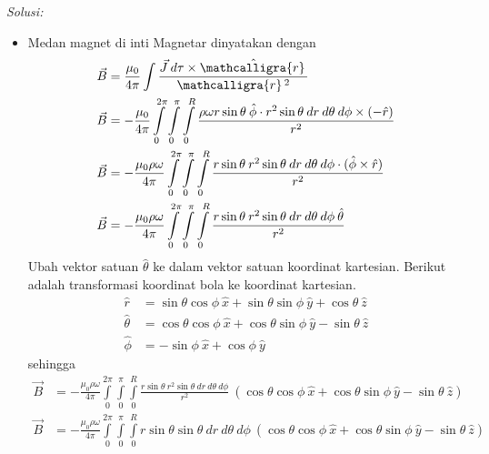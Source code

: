 \documentclass[a4paper, 11pt]{article}
\newcommand{\scriptr}{\mathcalligra{r}\,}
\newenvironment{solution}
    {\textit{Solusi:}}
    {}
\begin{document}
\begin{solution}
\begin{itemize}
    \item[b.] Medan magnet di inti Magnetar dinyatakan dengan
    \begin{equation*}
    \begin{split}
        \vec{B} & = \frac{\mu_{0}}{4\pi} \int \frac{\vec{J}\:d\tau \times \hat{\scriptr}}{\scriptr^{2}}\\
        \vec{B} & = -\frac{\mu_{0}}{4\pi} \int \limits_{0}^{2\pi} \int \limits_{0}^{\pi} \int \limits_{0}^{R} \frac{\rho \omega r \sin{\theta} \:\hat{\phi} \cdot r^{2}\sin{\theta} \:dr \:d\theta \:d\phi \times (-\hat{r})}{r^{2}}\\
        \vec{B} & = -\frac{\mu_{0} \rho \omega}{4\pi} \int \limits_{0}^{2\pi} \int \limits_{0}^{\pi} \int \limits_{0}^{R} \frac{r\sin{\theta} \:r^{2}\sin{\theta} \:dr \:d\theta \:d\phi \cdot (\hat{\phi} \times \hat{r})}{r^{2}}\\
        \vec{B} & = -\frac{\mu_{0} \rho \omega}{4\pi} \int \limits_{0}^{2\pi} \int \limits_{0}^{\pi} \int \limits_{0}^{R} \frac{r\sin{\theta} \:r^{2}\sin{\theta} \:dr \:d\theta \:d\phi \:\hat{\theta}}{r^{2}}\\
    \end{split}
    \end{equation*}
    Ubah vektor satuan $\hat{\theta}$ ke dalam vektor satuan koordinat kartesian. Berikut adalah transformasi koordinat bola ke koordinat kartesian.
    \begin{equation*}
    \begin{split}
        \hat{r} & = \sin{\theta} \cos{\phi} \:\hat{x} + \sin{\theta} \sin{\phi} \:\hat{y} + \cos{\theta} \:\hat{z}\\
        \hat{\theta} & = \cos{\theta} \cos{\phi} \:\hat{x} + \cos{\theta} \sin{\phi} \:\hat{y} - \sin{\theta} \:\hat{z}\\
        \hat{\phi} & = -\sin{\phi} \:\hat{x} + \cos{\phi} \:\hat{y}
    \end{split}
    \end{equation*}
    sehingga
    \begin{equation*}
    \begin{split}
        \vec{B} & = -\frac{\mu_{0} \rho \omega}{4\pi} \int \limits_{0}^{2\pi} \int \limits_{0}^{\pi} \int \limits_{0}^{R} \frac{r\sin{\theta} \:r^{2}\sin{\theta} \:dr \:d\theta \:d\phi }{r^{2}} \:(\cos{\theta} \cos{\phi} \:\hat{x} + \cos{\theta} \sin{\phi} \:\hat{y} - \sin{\theta} \:\hat{z})\\
        \vec{B} & = -\frac{\mu_{0} \rho \omega}{4\pi} \int \limits_{0}^{2\pi} \int \limits_{0}^{\pi} \int \limits_{0}^{R} {r\sin{\theta} \sin{\theta} \:dr \:d\theta \:d\phi} \:(\cos{\theta} \cos{\phi} \:\hat{x} + \cos{\theta} \sin{\phi} \:\hat{y} - \sin{\theta} \:\hat{z})\\

\end{split}
\end{equation*}
\end{itemize}
\end{solution}
\end{document}
